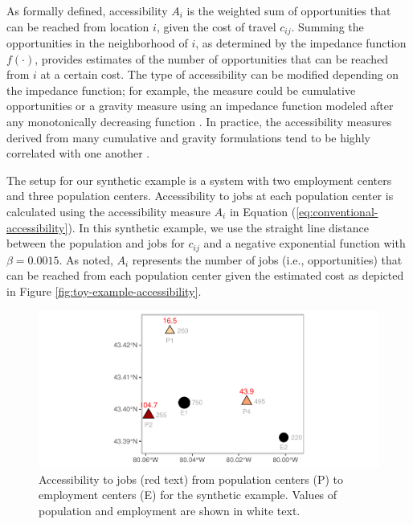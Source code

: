 \documentclass[]{elsarticle} %
\begin{document}
As formally defined, accessibility \(A_i\) is the weighted sum of
opportunities that can be reached from location \(i\), given the cost of
travel \(c_{ij}\). Summing the opportunities in the neighborhood of
\(i\), as determined by the impedance function \(f(\cdot)\), provides
estimates of the number of opportunities that can be reached from \(i\)
at a certain cost. The type of accessibility can be modified depending
on the impedance function; for example, the measure could be cumulative
opportunities \citep[if \(f(\cdot)\) is a binary or indicator function
e.g.,][]{elgeneidy_cost_2016, rosik_forecast_2021, geurs2004, qi_decadelong_2018}
or a gravity measure using an impedance function modeled after any
monotonically decreasing function \citep[e.g., Gaussian, inverse power,
negative exponential, or log-normal, among others, see, \emph{inter
alia},][]{kwan_spacetime_1998, vale_influence_2017, reggiani_accessibility_2011, li_approach_2020}.
In practice, the accessibility measures derived from many cumulative and
gravity formulations tend to be highly correlated with one another
\citep{higgins2019, santanapalacios2022, kwan_spacetime_1998}.

The setup for our synthetic example is a system with two employment
centers and three population centers. Accessibility to jobs at each
population center is calculated using the accessibility measure \(A_i\)
in Equation (\ref{eq:conventional-accessibility}). In this synthetic
example, we use the straight line distance between the population and
jobs for \(c_{ij}\) and a negative exponential function with
\(\beta = 0.0015\). As noted, \(A_i\) represents the number of jobs
(i.e., opportunities) that can be reached from each population center
given the estimated cost as depicted in Figure
\ref{fig:toy-example-accessibility}.

\begin{figure}
\includegraphics[width=1\linewidth]{Spatial-Availability-Refreshed_files/figure-latex/toy-example-accessibility-plot-1} \caption{\label{fig:toy-example-accessibility}Accessibility to jobs (red text) from population centers (P) to employment centers (E) for the synthetic example. Values of population and employment are shown in white text.}\label{fig:toy-example-accessibility-plot}
\end{figure}
\end{document}
